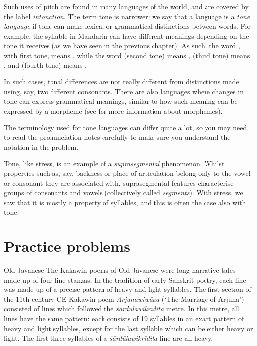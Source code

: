 \begin{refsection}
Such uses of pitch are found in many languages of the world, and are covered by the label \emph{intonation}. The term tone is narrower: we say that a language is a \textit{tone language} if tone can make lexical or grammatical distinctions between words. For example, the syllable  in Mandarin can have different meanings depending on the tone it receives (as we have seen in the previous chapter). As such, the word , with first tone, means , while the word  (second tone) means ,  (third tone) means , and  (fourth tone) means .

In such cases, tonal differences are not really different from distinctions made using, say, two different consonants. There are also languages where changes in tone can express grammatical meanings, similar to how such meaning can be expressed by a morpheme (see  for more information about morphemes).

The terminology used for tone languages can differ quite a lot, so you may need to read the pronunciation notes carefully to make sure you understand the notation in the problem.

Tone, like stress, is an example of a \emph{suprasegmental} phenomenon. Whilst properties such as, say, backness or place of articulation belong only to the vowel or consonant they are associated with, suprasegmental features characterise groups of consonants and vowels (collectively called \textit{segments}). With stress, we saw that it is mostly a property of syllables, and this is often the case also with tone. 

\hypertarget{practice-problems}{%
\section{Practice problems}}
\largerpage
\begin{problem}{Old Javanese}{\nameMSalter}{}
The Kakawin poems of Old Javanese were long narrative tales made up of four-line stanzas. In the tradition of early Sanskrit poetry, each line was made up of a precise pattern of heavy and light syllables. The first section of the 11th-century CE Kakawin poem \textit{Arjunawiwāha} (‘The Marriage of Arjuna’) consisted of lines which followed the \textit{śārdūlawikrīdita} metre. In this metre, all lines have the same pattern: each consists of 19 syllables in an exact pattern of heavy and light syllables, except for the last syllable which can be either heavy or light. The first three syllables of a \textit{śārdūlawikrīdita} line are all heavy.


\end{problem}
\end{refsection}
